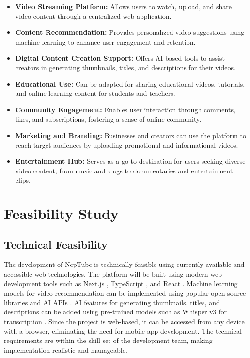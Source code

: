 \begin{itemize}[leftmargin=2cm]
  \item \textbf{Video Streaming Platform:} Allows users to watch, upload, and share video content through a centralized web application.
  \item \textbf{Content Recommendation:} Provides personalized video suggestions using machine learning to enhance user engagement and retention.
  \item \textbf{Digital Content Creation Support:} Offers AI-based tools to assist creators in generating thumbnails, titles, and descriptions for their videos.
  \item \textbf{Educational Use:} Can be adapted for sharing educational videos, tutorials, and online learning content for students and teachers.
  \item \textbf{Community Engagement:} Enables user interaction through comments, likes, and subscriptions, fostering a sense of online community.
  \item \textbf{Marketing and Branding:} Businesses and creators can use the platform to reach target audiences by uploading promotional and informational videos.
  \item \textbf{Entertainment Hub:} Serves as a go-to destination for users seeking diverse video content, from music and vlogs to documentaries and entertainment clips.
\end{itemize}

\section{Feasibility Study}

\subsection{Technical Feasibility}

The development of NepTube is technically feasible using currently available and accessible web technologies. The platform will be built using modern web development tools such as Next.js \cite{vercel2024nextjs}, TypeScript \cite{typescript2024docs}, and React \cite{react2024docs}. Machine learning models for video recommendation can be implemented using popular open-source libraries and AI APIs \cite{pollinations2024api}. AI features for generating thumbnails, titles, and descriptions can be added using pre-trained models such as Whisper v3 for transcription \cite{radford2023whisper}. Since the project is web-based, it can be accessed from any device with a browser, eliminating the need for mobile app development. The technical requirements are within the skill set of the development team, making implementation realistic and manageable.


